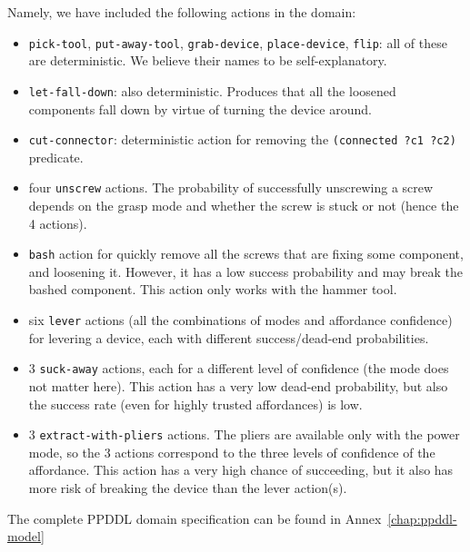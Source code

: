 \documentclass[../root.tex]{subfiles}
\begin{document}
Namely, we have included the following actions in the domain:
\begin{itemize}
	\item \texttt{pick-tool}, \texttt{put-away-tool}, \texttt{grab-device},
	\texttt{place-device}, \texttt{flip}: all of these are deterministic.
	We believe their names to be self-explanatory.
	\item \texttt{let-fall-down}: also deterministic. Produces that all
	the loosened components fall down by virtue of turning the device
	around.
	\item \texttt{cut-connector}: deterministic action for removing
	the \texttt{(connected ?c1 ?c2)} predicate.
	\item four \texttt{unscrew} actions. The probability of
	successfully unscrewing a screw depends on the grasp mode and whether
	the screw is stuck or not (hence the 4 actions).
	\item \texttt{bash} action for quickly remove all the screws that
	are fixing some component, and loosening it. However, it has a low
	success probability and may break the bashed component. This action
	only works with the hammer tool.
	\item six \texttt{lever} actions (all the combinations of modes
	and affordance confidence) for levering a device, each with different
	success/dead-end probabilities.
	\item 3 \texttt{suck-away} actions, each for a different level
	of confidence (the mode does not matter here). This action has a
	very low dead-end probability, but also the success rate (even
	for highly trusted affordances) is low.
	\item 3 \texttt{extract-with-pliers} actions. The pliers are available
	only with the power mode, so the 3 actions correspond to the three
	levels of confidence of the affordance. This action has a very
	high chance of succeeding, but it also has more risk of breaking
	the device than the lever action(s).
\end{itemize}

The complete PPDDL domain specification can be found
in Annex~\ref{chap:ppddl-model}

\end{document}
